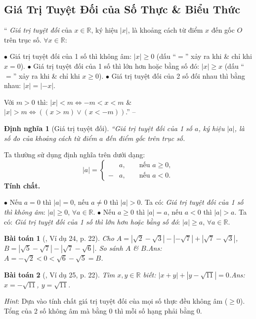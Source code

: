 \documentclass{article}
\newtheorem{baitoan}{Bài toán}
\newtheorem{dinhnghia}{Định nghĩa}
\begin{document}

\subsection{Giá Trị Tuyệt Đối của  Số Thực \& Biểu Thức}
``
	 \textit{Giá trị tuyệt đối} của $x\in\mathbb{R}$, ký hiệu $|x|$, là khoảng cách từ điểm $x$ đến gốc $O$ trên trục số.
	 $\forall x\in\mathbb{R}$:
	
		$\bullet$ Giá trị tuyệt đối của 1 số thì không âm: $|x|\ge 0$ (dấu ``$=$'' xảy ra khi \& chỉ khi $x = 0$).
		$\bullet$ Giá trị tuyệt đối của 1 số thì lớn hơn hoặc bằng số đó: $|x|\ge x$ (dấu ``$=$'' xảy ra khi \& chỉ khi $x\ge 0$).
		$\bullet$ Giá trị tuyệt đối của 2 số đối nhau thì bằng nhau: $|x| = |-x|$.
	

Với $m > 0$ thì: $|x| < m\Leftrightarrow -m < x < m$ \& $|x| > m\Leftrightarrow((x > m)\lor(x < - m))$.'' -- \cite[Chap. 2, \S3, pp. 21--22]{Tuyen_Toan_7}

\begin{dinhnghia}[Giá trị tuyệt đối]
	``\emph{Giá trị tuyệt đối} của 1 số $a$, ký hiệu $|a|$, là số đo của khoảng cách từ điểm $a$ đến điểm gốc trên trục số.
\end{dinhnghia}
Ta thường sử dụng định nghĩa trên dưới dạng:
\begin{equation*}
	|a| = \left\{\begin{split}
		&a,&&\mbox{ nếu }a\ge 0,\\
		-&a,&&\mbox{ nếu }a < 0.
	\end{split}\right.
\end{equation*}
\textbf{Tính chất.}

	$\bullet$ Nếu $a = 0$ thì $|a| = 0$, nếu $a\ne 0$ thì $|a| > 0$. Ta có: \textit{Giá trị tuyệt đối của 1 số thì không âm}: $|a|\ge 0$, $\forall a\in\mathbb{R}$.
	$\bullet$ Nếu $a\ge 0$ thì $|a| = a$, nếu $a < 0$ thì $|a| > a$. Ta có: \textit{Giá trị tuyệt đối của 1 số thì lớn hơn hoặc bằng số đó}: $|a|\ge a$, $\forall a\in\mathbb{R}$.


\begin{baitoan}[\cite{Tuyen_Toan_7}, Ví dụ 24, p. 22]
	Cho $A = |\sqrt{2} - \sqrt{3}| - |-\sqrt{7}| + |\sqrt{7} - \sqrt{3}|$, $B = |\sqrt{5} - \sqrt{7}| - |\sqrt{7} - \sqrt{6}|$. So sánh $A$ \& $B$.\hfill{\sf Ans:} $A = -\sqrt{2} < 0 < \sqrt{6} - \sqrt{5} = B$.
\end{baitoan}	

\begin{baitoan}[\cite{Tuyen_Toan_7}, Ví dụ 25, p. 22]
	Tìm $x,y\in\mathbb{R}$ biết: $|x + y| + |y - \sqrt{11}| = 0$.\hfill{\sf Ans:} $x = -\sqrt{11}$, $y = \sqrt{11}$.
\end{baitoan}
\noindent\textit{Hint}: Dựa vào tính chất giá trị tuyệt đối của mọi số thực đều không âm ($\ge 0$). Tổng của 2 số không âm mà bằng $0$ thì mỗi số hạng phải bằng $0$.
\end{document}
